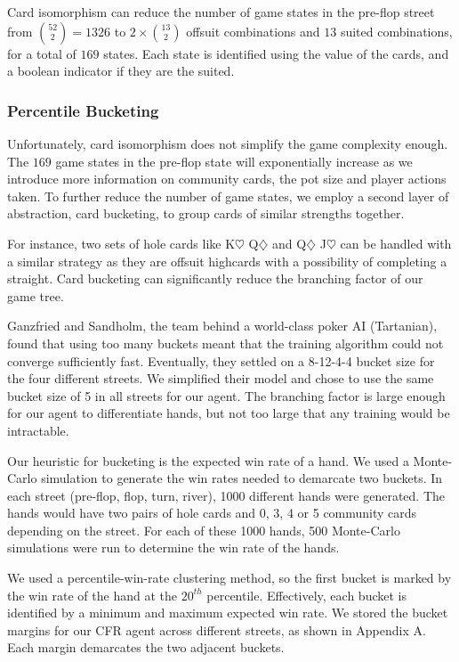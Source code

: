 \documentclass{article}
\begin{document}
Card isomorphism can reduce the number of game states in the pre-flop street from ${52 \choose 2} = 1326$ to $2 \times {13 \choose 2}$ offsuit combinations and $13$ suited combinations, for a total of $169$ states. Each state is identified using the value of the cards, and a boolean indicator if they are the suited.

\subsubsection{Percentile Bucketing}
Unfortunately, card isomorphism does not simplify the game complexity enough. The $169$ game states in the pre-flop state will exponentially increase as we introduce more information on community cards, the pot size and player actions taken. To further reduce the number of game states, we employ a second layer of abstraction, card bucketing, to group cards of similar strengths together. 

For instance, two sets of hole cards like K$\heartsuit$ Q$\diamondsuit$ and Q$\diamondsuit$ J$\heartsuit$ can be handled with a similar strategy as they are offsuit highcards with a possibility of completing a straight. Card bucketing can significantly reduce the branching factor of our game tree.

Ganzfried and Sandholm, the team behind a world-class poker AI (Tartanian), found that using too many buckets meant that the training algorithm could not converge sufficiently fast. Eventually, they settled on a 8-12-4-4 bucket size for the four different streets. We simplified their model and chose to use the same bucket size of 5 in all streets for our agent. The branching factor is large enough for our agent to differentiate hands, but not too large that any training would be intractable.

Our heuristic for bucketing is the expected win rate of a hand. We used a Monte-Carlo simulation to generate the win rates needed to demarcate two buckets. In each street (pre-flop, flop, turn, river), 1000 different hands were generated. The hands would have  two pairs of hole cards and 0, 3, 4 or 5 community cards depending on the street. For each of these 1000 hands, 500 Monte-Carlo simulations were run to determine the win rate of the hands.

We used a percentile-win-rate clustering method, so the first bucket is marked by the win rate of the hand at the $20^{th}$ percentile. Effectively, each bucket is identified by a minimum and maximum expected win rate. We stored the bucket margins for our CFR agent across different streets, as shown in Appendix A. Each margin demarcates the two adjacent buckets.
\end{document}
